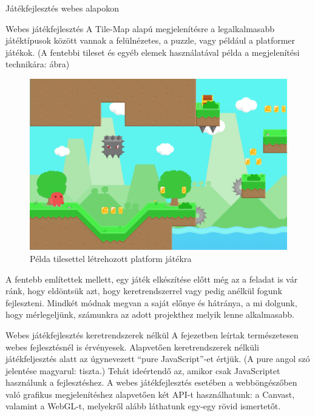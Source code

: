\begin{MyChapter}{Játékfejlesztés webes alapokon}
\begin{MySection}{Webes játékfejlesztés}
		A Tile-Map alapú megjelenítésre a legalkalmasabb játéktípusok között vannak a felülnézetes, a puzzle, vagy például a platformer játékok. (A fentebbi tileset és egyéb elemek használatával példa a megjelenítési technikára:  ábra)
		
		\begin{figure}[H]
			\centering
			\includegraphics[scale=0.3]{kepek/tileMap/TileMapPreview.png}
			\caption{Példa tilesettel létrehozott platform játékra}
			\label{fig:tileMap:tileMapPreview}
		\end{figure}
		
		A fentebb említettek mellett, egy játék elkészítése előtt még az a feladat is vár ránk, hogy eldöntsük azt, hogy keretrendszerrel vagy pedig anélkül fogunk fejleszteni. 
		Mindkét módnak megvan a saját előnye és hátránya, a mi dolgunk, hogy mérlegeljünk, számunkra az adott projekthez melyik lenne alkalmasabb.
		\cite{tile_map}
	\end{MySection}

	\begin{MySection}{Webes játékfejlesztés keretrendszerek nélkül}
		A  fejezetben leírtak természetesen webes fejlesztésnél is érvényesek.
		Alapvetően keretrendszerek nélküli játékfeljesztés alatt az úgynevezett ``pure JavaScript''-et értjük. (A pure angol szó jelentése magyarul: tiszta.)
		Tehát ideértendő az, amikor csak JavaScriptet használunk a fejlesztéshez. 
		A webes játékfejlesztés esetében a webböngészőben való grafikus megjelenítéshez alapvetően két API-t használhatunk: a Canvast, valamint a WebGL-t, melyekről alább láthatunk egy-egy rövid ismertetőt.
		

\end{MySection}
\end{MyChapter}
